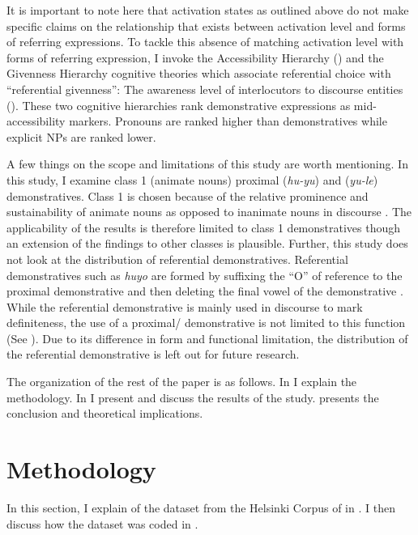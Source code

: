 \documentclass[output=paper,
modfonts
]{langscibook}
\begin{document}
It is important to note here that  activation states as outlined above do not make specific claims on the relationship that exists between activation level and forms of referring expressions. To tackle this absence of matching activation level with forms of referring expression, I invoke the Accessibility Hierarchy (\citealt{Ariel1988,Ariel1991,Ariel2001}) and the Givenness Hierarchy \citep{GundelEtAl1993} cognitive theories which associate referential choice with “referential givenness”: The awareness level of interlocutors to discourse entities (\citealt{GundelFretheim2006}). These two cognitive hierarchies rank demonstrative expressions as mid-accessibility markers. Pronouns are ranked higher than demonstratives while explicit NPs are ranked lower.

A few things on the scope and limitations of this study are worth mentioning. In this study, I examine class 1 (animate nouns) proximal (\textit{hu-yu}) and  (\textit{yu-le}) demonstratives. Class 1 is chosen because of the relative prominence and sustainability of animate nouns as opposed to inanimate nouns in discourse \citep{Givón1976,Givón1983}. The applicability of the results is therefore limited to class 1 demonstratives though an extension of the findings to other  classes is plausible. Further, this study does not look at the distribution of referential demonstratives. Referential demonstratives such as \textit{huyo} are formed by suffixing the “O” of reference to the proximal demonstrative and then deleting the final vowel of the demonstrative \citep{Ashton1944}. While the referential demonstrative is mainly used in discourse to mark definiteness, the use of a proximal/ demonstrative is not limited to this function (See ). Due to its difference in form and functional limitation, the distribution of the referential demonstrative is left out for future research.

The organization of the rest of the paper is as follows. In  I explain the methodology. In  I present and discuss the results of the study.  presents the conclusion and theoretical implications.

\section{Methodology}\label{sec:mwamzandi:2}

In this section, I explain  of the dataset from the Helsinki Corpus of  in . I then discuss how the dataset was coded in .
\end{document}
